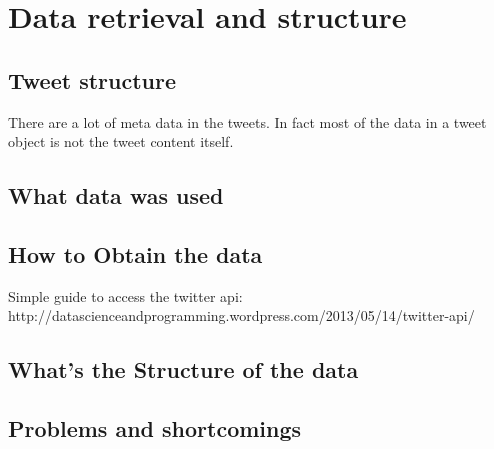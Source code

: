 \section{Data retrieval and structure}

\subsection{Tweet structure}
There are a lot of meta data in the tweets. In fact most of the data in a tweet
object is not the tweet content itself. 

\subsection{What data was used}
\subsection{How to Obtain the data}
Simple guide to access the twitter api:  http://datascienceandprogramming.wordpress.com/2013/05/14/twitter-api/

\subsection{What's the Structure of the data}
\subsection{Problems and shortcomings}
